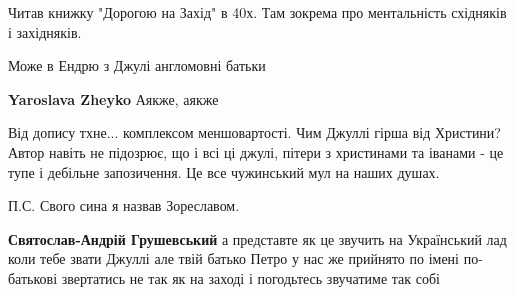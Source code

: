 \begin{itemize}
Читав книжку "Дорогою на Захід" в 40х. Там зокрема про ментальність східняків і західняків.

 
Може в Ендрю з Джулі англомовні батьки

\begin{itemize}
 
\textbf{Yaroslava Zheyko} Аякже, аякже \Laughey[1.0][white]
\end{itemize}

 

Від допису тхне... комплексом меншовартості. Чим Джуллі гірша від Христини? Автор
навіть не підозрює, що і всі ці джулі, пітери з христинами та іванами - це тупе і
дебільне запозичення. Це все чужинський мул на наших душах.

П.С. Свого сина я назвав Зореславом.

\begin{itemize}
 
\textbf{Святослав-Андрій Грушевський} а представте як це звучить на Український
лад коли тебе звати Джуллі але твій батько Петро у нас же прийнято по імені
по-батькові звертатись не так як на заході і погодьтесь звучатиме так собі

 

\end{itemize}
\end{itemize}
